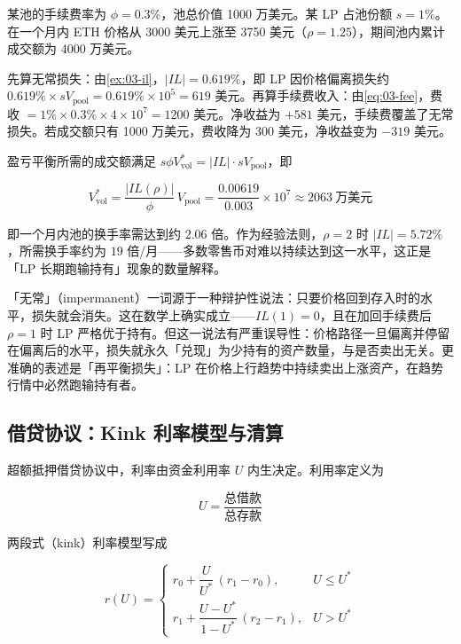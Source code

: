 \begin{example}[手续费能否覆盖无常损失]\label{ex:03-il-fee}
某池的手续费率为 $\phi = 0.3\%$，池总价值 1000 万美元。某 LP 占池份额 $s = 1\%$。在一个月内 ETH 价格从 3000 美元上涨至 3750 美元（$\rho = 1.25$），期间池内累计成交额为 4000 万美元。

先算无常损失：由\cref{ex:03-il}，$|IL| = 0.619\%$，即 LP 因价格偏离损失约 $0.619\%\times sV_{\text{pool}} = 0.619\%\times10^{5}=619$ 美元。再算手续费收入：由\cref{eq:03-fee}，费收 $= 1\%\times0.3\%\times4\times10^{7} = 1200$ 美元。净收益为 $+581$ 美元，手续费覆盖了无常损失。若成交额只有 1000 万美元，费收降为 300 美元，净收益变为 $-319$ 美元。

盈亏平衡所需的成交额满足 $s\phi V_{\text{vol}}^{*} = |IL|\cdot sV_{\text{pool}}$，即

\[
  V_{\text{vol}}^{*} = \frac{|IL(\rho)|}{\phi}\,V_{\text{pool}}
  = \frac{0.00619}{0.003}\times 10^{7} \approx 2063\ \text{万美元}
\]

即一个月内池的换手率需达到约 $2.06$ 倍。作为经验法则，$\rho = 2$ 时 $|IL| = 5.72\%$，所需换手率约为 $19$ 倍/月——多数零售币对难以持续达到这一水平，这正是「LP 长期跑输持有」现象的数量解释。
\end{example}

\begin{intuitionbox}[无常损失为什么叫「无常」]
「无常」（impermanent）一词源于一种辩护性说法：只要价格回到存入时的水平，损失就会消失。这在数学上确实成立——$IL(1)=0$，且在加回手续费后 $\rho=1$ 时 LP 严格优于持有。但这一说法有严重误导性：价格路径一旦偏离并停留在偏离后的水平，损失就永久「兑现」为少持有的资产数量，与是否卖出无关。更准确的表述是「再平衡损失」：LP 在价格上行趋势中持续卖出上涨资产，在趋势行情中必然跑输持有者。
\end{intuitionbox}

\subsection{借贷协议：Kink 利率模型与清算}

超额抵押借贷协议中，利率由资金利用率 $U$ 内生决定。利用率定义为

\begin{equation}
  U = \frac{\text{总借款}}{\text{总存款}}
  \label{eq:03-util}
\end{equation}

两段式（kink）利率模型写成

\begin{equation}
  r(U) =
  \begin{cases}
    r_0 + \dfrac{U}{U^{*}}\,(r_1 - r_0), & U \le U^{*} \\[6pt]
    r_1 + \dfrac{U - U^{*}}{1 - U^{*}}\,(r_2 - r_1), & U > U^{*}
  \end{cases}
  \label{eq:03-kink}
\end{equation}

